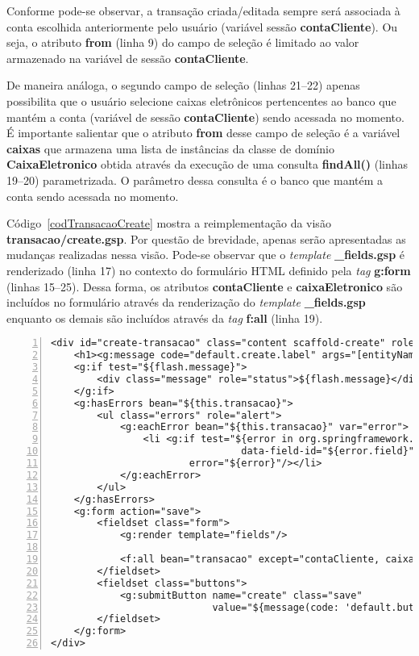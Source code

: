 Conforme pode-se  observar, a transação  criada/editada sempre será  associada à
conta   escolhida    anteriormente   pelo   usuário    (variável   sessão   {\bf
  contaCliente}). Ou seja, o atributo {\bf from} (linha 9) do campo de seleção é
limitado ao valor armazenado na variável de sessão {\bf contaCliente}. 

\vspace{0.2cm}

De  maneira  análoga,  o  segundo   campo  de  seleção  (linhas  21--22)  apenas
possibilita que o usuário selecione caixas eletrônicos pertencentes ao banco que
mantém  a  conta (variável  de  sessão  {\bf  contaCliente}) sendo  acessada  no
momento.   É importante  salientar  que o  atributo  {\bf from}  desse campo  de
seleção é a variável {\bf caixas} que armazena uma lista de instâncias da classe
de domínio {\bf CaixaEletronico} obtida através da execução de uma consulta {\bf
  findAll()} (linhas 19--20) parametrizada. O parâmetro dessa consulta é o banco 
que mantém a conta sendo acessada no momento. 

\vspace{0.2cm}

Código~\ref{codTransacaoCreate}   mostra  a   reimplementação   da  visão   {\bf
  transacao/create.gsp}. Por questão de  brevidade, apenas serão apresentadas as
mudanças realizadas  nessa visão.   Pode-se observar que  o {\it  template} {\bf
  \_fields.gsp} é renderizado (linha 17) no contexto do formulário HTML definido 
pela {\it  tag} {\bf  g:form} (linhas 15--25).   Dessa forma, os  atributos {\bf
  contaCliente} e  {\bf caixaEletronico} são incluídos no  formulário através da
renderização  do  {\it  template}  {\bf  \_fields.gsp} enquanto  os  demais  são
incluídos através da {\it tag} {\bf f:all} (linha 19).  

\begin{lstlisting}[caption={\bf    transacao/create.gsp},
    frame=trBL, float=htbp, label=codTransacaoCreate, numbers=left]
<div id="create-transacao" class="content scaffold-create" role="main">
    <h1><g:message code="default.create.label" args="[entityName]"/></h1>
    <g:if test="${flash.message}">
        <div class="message" role="status">${flash.message}</div>
    </g:if>
    <g:hasErrors bean="${this.transacao}">
        <ul class="errors" role="alert">
            <g:eachError bean="${this.transacao}" var="error">
                <li <g:if test="${error in org.springframework.validation.FieldError}">
                                 data-field-id="${error.field}"</g:if>><g:message
                        error="${error}"/></li>
            </g:eachError>
        </ul>
    </g:hasErrors>
    <g:form action="save">
        <fieldset class="form">
            <g:render template="fields"/>

            <f:all bean="transacao" except="contaCliente, caixaEletronico"/>
        </fieldset>
        <fieldset class="buttons">
            <g:submitButton name="create" class="save"
                            value="${message(code: 'default.button.create.label', default: 'Create')}"/>
        </fieldset>
    </g:form>
</div>
\end{lstlisting}

